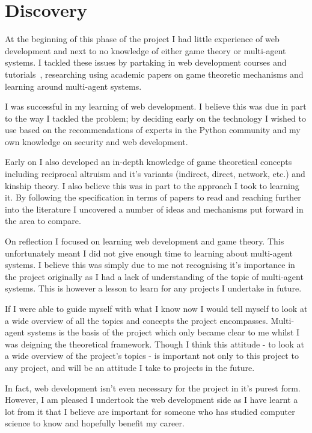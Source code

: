 \documentclass[]{final_report}
\begin{document}
\section{Discovery}
At the beginning of this phase of the project I had little experience of web development and next to no knowledge of either game theory or multi-agent systems. I tackled these issues by partaking in web development courses and tutorials~\cite{flask_tut, swi_web_tut}, researching using academic papers on game theoretic mechanisms and learning around multi-agent systems.\par 
I was successful in my learning of web development. I believe this was due in part to the way I tackled the problem; by deciding early on the technology I wished to use based on the recommendations of experts in the Python community and my own knowledge on security and web development.\par 
Early on I also developed an in-depth knowledge of game theoretical concepts including reciprocal altruism and it's variants (indirect, direct, network, etc.) and kinship theory. I also believe this was in part to the approach I took to learning it. By following the specification in terms of papers to read and reaching further into the literature I uncovered a number of ideas and mechanisms put forward in the area to compare.\par 
On reflection I focused on learning web development and game theory. This unfortunately meant I did not give enough time to learning about multi-agent systems. I believe this was simply due to me not recognising it's importance in the project originally as I had a lack of understanding of the topic of multi-agent systems. This is however a lesson to learn for any projects I undertake in future.\par
If I were able to guide myself with what I know now I would tell myself to look at a wide overview of all the topics and concepts the project encompasses. Multi-agent systems is the basis of the project which only became clear to me whilst I was deigning the theoretical framework. Though I think this attitude - to look at a wide overview of the project's topics - is important not only to this project to any project, and will be an attitude I take to projects in the future.\par 
In fact, web development isn't even necessary for the project in it's purest form. However, I am pleased I undertook the web development side as I have learnt a lot from it that I believe are important for someone who has studied computer science to know and hopefully benefit my career.
\end{document}
